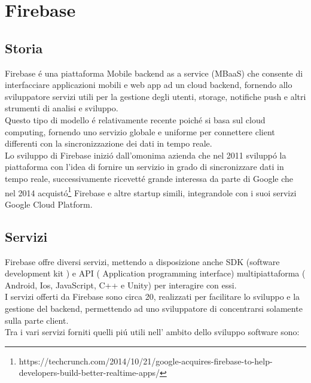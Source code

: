 \chapter{Firebase}                %
\lhead[\fancyplain{}{\bfseries\thepage}]{\fancyplain{}{\bfseries\rightmark}}
\section{Storia}                 %


Firebase \'e una piattaforma Mobile backend as a service (MBaaS) che consente
di interfacciare applicazioni mobili e web app ad un cloud backend, fornendo allo sviluppatore servizi utili per la gestione degli utenti, storage, notifiche push e altri strumenti di analisi e sviluppo.\\
Questo tipo di modello \'e relativamente recente poich\'e si basa sul cloud computing, fornendo uno servizio globale e uniforme per connettere client differenti con la sincronizzazione dei dati in tempo reale.\\
Lo sviluppo di Firebase inizi\'o dall'omonima azienda che nel 2011 svilupp\'o la piattaforma con l'idea di fornire un servizio in grado di sincronizzare dati in tempo reale, successivamente ricevett\'e grande interessa da parte di Google che nel 2014 acquist\'o\footnote{https://techcrunch.com/2014/10/21/google-acquires-firebase-to-help-developers-build-better-realtime-apps/} Firebase e altre startup simili, integrandole con i suoi servizi Google Cloud Platform.






\section{Servizi}                 %
Firebase offre diversi servizi, mettendo a disposizione anche SDK (software development kit ) e API ( Application programming interface) multipiattaforma ( Android, Ios, JavaScript, C++ e Unity) per interagire con essi.\\
I servizi offerti da Firebase sono circa 20, realizzati per facilitare lo sviluppo e la gestione del backend, permettendo ad uno sviluppatore di concentrarsi solamente sulla parte client.\\
Tra i vari servizi forniti quelli pi\'u utili nell' ambito dello sviluppo software sono:



